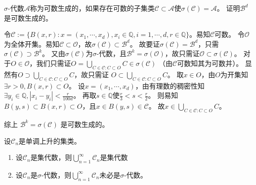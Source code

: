 \documentclass{ctexart}
\begin{document}
\begin{problem}\label{pro:1.4.3}
  \(\sigma \)-代数\(\mathcal{A} \)称为可数生成的，如果存在可数的子集类\(\mathcal{C} \subset \mathcal{A} \)使\(\sigma(\mathcal{C})=\mathcal{A} \)。
  证明\(\mathcal{B}^d \)是可数生成的。
\end{problem}
\begin{solution}
  令\(\mathcal{C}:=\{B(x,r):x=(x_1,\cdots,x_d),x_i \in \mathbb{Q},i=1,\cdots,d, r \in \mathbb{Q}\} \)。易知\(\mathcal{C} \)可数。
  令\(\mathcal{O} \)为全体开集。易知\(\mathcal{C} \subset \mathcal{O} \)，故\(\sigma(\mathcal{C}) \subset \mathcal{B}^d \)。
  故要证\(\sigma(\mathcal{C})=\mathcal{B}^d \)，只需\(\sigma(\mathcal{C}) \supset \mathcal{B}^k \)。
  又由\(\sigma(\mathcal{C}) \)为\(\sigma \)-代数，且\(\mathcal{B}^k=\sigma(\mathcal{O}) \)，故只需证\(\mathcal{O} \subset \sigma(\mathcal{C}) \)。
  对于\(O \in \mathcal{O}\)，我们只需证\(O = \bigcup_{C \in \mathcal{C}:C \subset O} C \in \sigma(\mathcal{C}) \) （由\(\mathcal{C} \)可数知其为可数并）。
  显然有\( O \supset \bigcup_{C \in \mathcal{C}:C \subset O} C \)，故只需证
  \( O \subset \bigcup_{C \in \mathcal{C}:C \subset O} C  \)。
  取\(x \in O \)，由\(O \)为开集知\(\exists r >0,B(x,r) \subset O \)。
  设\(x=(x_1,\cdots,x_d) \)，由有理数的稠密性知\(\exists y_i \in \mathbb{Q},|x_i-y_i| < \frac{r}{100d} \)。
  再取\(s \in \mathbb{Q} \)使\(\frac{r}{3} < s < \frac{r}{2} \)。
  则易知\(B(y,s) \subset B(x,r) \subset O \)，且\(x \in B(y,s) \in \mathcal{C} \)。
  故\(x \in \bigcup_{C \in \mathcal{C}:C \subset O} C \)。

  综上 \(\mathcal{B}^k=\sigma(\mathcal{C}) \) 是可数生成的。
\end{solution}
\begin{problem}\label{pro:1.4.4}
  设\(\mathcal{C}_n \)是单调上升的集类。
  \begin{enumerate}
    \item
      设\(\mathcal{C}_n \)是集代数，则\(\bigcup_{n=1}^{\infty} \mathcal{C}_n\)是集代数
    \item 设\(\mathcal{C}_n \)是\(\sigma \)-代数，则\(\bigcup_{n=1}^{\infty}\mathcal{C}_n \)未必是\(\sigma \)-代数。
  \end{enumerate}
\end{problem}
\end{document}
